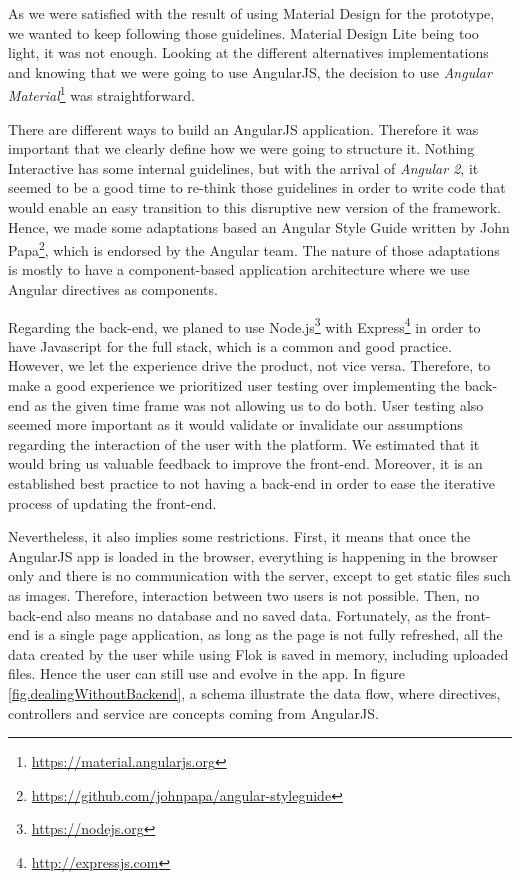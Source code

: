 \documentclass[a4paper,12pt,twoside]{article}
\begin{document}
As we were satisfied with the result of using Material Design for the prototype, we wanted to keep following those guidelines.
Material Design Lite being too light, it was not enough.
Looking at the different alternatives implementations and knowing that we were going to use AngularJS, the decision to use \emph{Angular Material}\footnote{\url{https://material.angularjs.org}} was straightforward.

There are different ways to build an AngularJS application.
Therefore it was important that we clearly define how we were going to structure it.
Nothing Interactive has some internal guidelines, but with the arrival of \emph{Angular 2}, it seemed to be a good time to re-think those guidelines in order to write code that would enable an easy transition to this disruptive new version of the framework.
Hence, we made some adaptations based an Angular Style Guide written by John Papa\footnote{\url{https://github.com/johnpapa/angular-styleguide}}, which is endorsed by the Angular team.
The nature of those adaptations is mostly to have a component-based application architecture where we use Angular directives as components.

Regarding the back-end, we planed to use Node.js\footnote{\url{https://nodejs.org}} with Express\footnote{\url{http://expressjs.com}} in order to have Javascript for the full stack, which is a common and good practice.
However, we let the experience drive the product, not vice versa.
Therefore, to make a good experience we prioritized user testing over implementing the back-end as the given time frame was not allowing us to do both.
User testing also seemed more important as it would validate or invalidate our assumptions regarding the interaction of the user with the platform.
We estimated that it would bring us valuable feedback to improve the front-end.
Moreover, it is an established best practice to not having a back-end in order to ease the iterative process of updating the front-end.

Nevertheless, it also implies some restrictions.
First, it means that once the AngularJS app is loaded in the browser, everything is happening in the browser only and there is no communication with the server, except to get static files such as images.
Therefore, interaction between two users is not possible.
Then, no back-end also means no database and no saved data.
Fortunately, as the front-end is a single page application, as long as the page is not fully refreshed, all the data created by the user while using Flok is saved in memory, including uploaded files.
Hence the user can still use and evolve in the app.
In figure \ref{fig.dealingWithoutBackend}, a schema illustrate the data flow, where directives, controllers and service are concepts coming from AngularJS.
\end{document}
